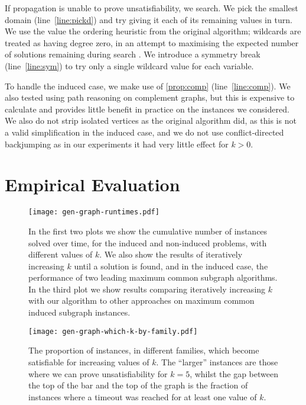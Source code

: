 \documentclass[letterpaper]{article}
\newcommand{\citep}[1]{\cite{#1}}
\theoremstyle{definition}
\begin{document}
If propagation is unable to prove unsatisfiability, we search. We pick the smallest domain
(line~\ref{line:pickd}) and try giving it each of its remaining values in turn. We use the value the
ordering heuristic from the original algorithm; wildcards are treated as having degree zero, in an
attempt to maximising the expected number of solutions remaining during search
\citep{DBLP:conf/ijcai/McCreeshPT16}.  We introduce a symmetry break (line~\ref{line:sym}) to try
only a single wildcard value for each variable.

To handle the induced case, we make use of \cref{prop:comp} (line~\ref{line:comp}). We also tested
using path reasoning on complement graphs, but this is expensive to calculate and provides little
benefit in practice on the instances we considered.  We also do not strip isolated vertices as the
original algorithm did, as this is not a valid simplification in the induced case, and we do not use
conflict-directed backjumping as in our experiments it had very little effect for $k > 0$.

\section{Empirical Evaluation}\label{section:evaluation}

\begin{figure*}[tb]
    \centering
    \texttt{[image: gen-graph-runtimes.pdf]}
    \caption{In the first two plots we show the cumulative number of instances solved over time, for the
        induced and non-induced problems, with different values of $k$. We also show the results of
        iteratively increasing $k$ until a solution is found, and in the induced case, the
        performance of two leading maximum common subgraph algorithms. In the third plot we show results
        comparing iteratively increasing $k$ with our algorithm to other approaches on maximum
        common induced subgraph instances.}\label{figure:runtimes}
\end{figure*}

\begin{figure}[h!]
    \centering
    \texttt{[image: gen-graph-which-k-by-family.pdf]}
    \caption{The proportion of instances, in different families, which become satisfiable for
    increasing values of $k$. The ``larger'' instances are those where we can prove unsatisfiability for
    $k = 5$, whilst the gap between the top of the bar and the top of the graph is the fraction of
    instances where a timeout was reached for at least one value of $k$.}\label{figure:which-k}
\end{figure}
\end{document}
